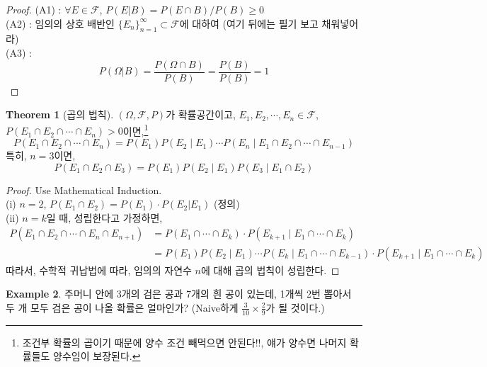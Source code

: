 \documentclass{article}
\theoremstyle{definition}
\newtheorem{theorem}{Theorem}
\newtheorem{example}[theorem]{Example}
\begin{document}
\begin{proof}
    (A1) : $\forall E \in \mathcal{F}$, $P(E|B) = P(E \cap B) / P(B) \geq 0 $
    \\ \noindent (A2) : 임의의 상호 배반인 $\{E_n\}_{n=1}^\infty \subset \mathcal{F}$에 대하여 (여기 뒤에는 필기 보고 채워넣어라)
    \\ \noindent (A3) : 
    \begin{equation*}
        P(\Omega | B)  = \frac{P(\Omega \cap B)}{P(B)} = \frac{P(B)}{P(B)} = 1
    \end{equation*}
\end{proof}

\begin{theorem}[곱의 법칙]
    $(\Omega, \mathcal{F}, P)$가 확률공간이고, $E_1, E_2, \cdots, E_n \in \mathcal{F}$, $P(E_1 \cap E_2 \cap \cdots \cap E_n) > 0$이면,\footnote{조건부 확률의 곱이기 때문에 양수 조건 빼먹으면 안된다!!, 얘가 양수면 나머지 확률들도 양수임이 보장된다.}
    \begin{equation*}
        P(E_1 \cap E_2 \cap \cdots \cap E_n) = P(E_1) P(E_2 \mid E_1) \cdots P(E_n \mid E_1 \cap E_2 \cap \cdots \cap E_{n-1})
    \end{equation*}
    특히, $n=3$이면,
    \begin{equation*}
        P(E_1 \cap E_2 \cap E_3) = P(E_1) P(E_2 \mid E_1) P(E_3 \mid E_1 \cap E_2)
    \end{equation*}
\end{theorem} 

\begin{proof}
    Use Mathematical Induction.\\
    \noindent
    (i) $n=2$, $P(E_1 \cap E_2) = P(E_1) \cdot P(E_2 | E_1)$ (정의)\\
    \noindent
    (ii) $n=k$일 때, 성립한다고 가정하면,
    \begin{align*}
        P(E_1 \cap E_2 \cap \cdots \cap E_n \cap E_{n+1}) &=  P(E_1 \cap \cdots \cap E_k) \cdot P(E_{k+1} \mid E_1 \cap \cdots \cap E_k)\\
        &= P(E_1) P(E_2 \mid E_1) \cdots P(E_k \mid E_1 \cap \cdots \cap E_{k-1}) \cdot P(E_{k+1} \mid E_1 \cap \cdots \cap E_k)
    \end{align*}
    따라서, 수학적 귀납법에 따라, 임의의 자연수 $n$에 대해 곱의 법칙이 성립한다.
\end{proof}

\begin{example}
    주머니 안에 3개의 검은 공과 7개의 흰 공이 있는데, 1개씩 2번 뽑아서 두 개 모두 검은 공이 나올 확률은 얼마인가? (Naive하게 $\frac{3}{10} \times \frac{2}{9}$가 될 것이다.)
\end{example}
\end{document}
